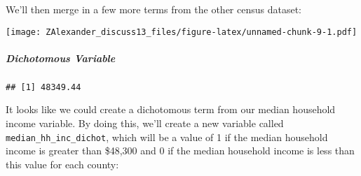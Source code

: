 \documentclass[
]{article}
\newenvironment{Shaded}{\begin{snugshade}}{\end{snugshade}}
\newcommand{\DataTypeTok}[1]{\textcolor[rgb]{0.13,0.29,0.53}{#1}}
\newcommand{\DecValTok}[1]{\textcolor[rgb]{0.00,0.00,0.81}{#1}}
\newcommand{\KeywordTok}[1]{\textcolor[rgb]{0.13,0.29,0.53}{\textbf{#1}}}
\newcommand{\NormalTok}[1]{#1}
\newcommand{\OperatorTok}[1]{\textcolor[rgb]{0.81,0.36,0.00}{\textbf{#1}}}
\newcommand{\StringTok}[1]{\textcolor[rgb]{0.31,0.60,0.02}{#1}}
\begin{document}
We'll then merge in a few more terms from the other census dataset:

\begin{Shaded}
\end{Shaded}

\begin{Shaded}
\end{Shaded}

\texttt{[image: ZAlexander\_discuss13\_files/figure-latex/unnamed-chunk-9-1.pdf]}

\hypertarget{dichotomous-variable}{%
\subparagraph{Dichotomous Variable}\label{dichotomous-variable}}

\begin{Shaded}
\end{Shaded}

\begin{verbatim}
## [1] 48349.44
\end{verbatim}

It looks like we could create a dichotomous term from our median
household income variable. By doing this, we'll create a new variable
called \texttt{median\_hh\_inc\_dichot}, which will be a value of 1 if
the median household income is greater than \$48,300 and 0 if the median
household income is less than this value for each county:
\end{document}
